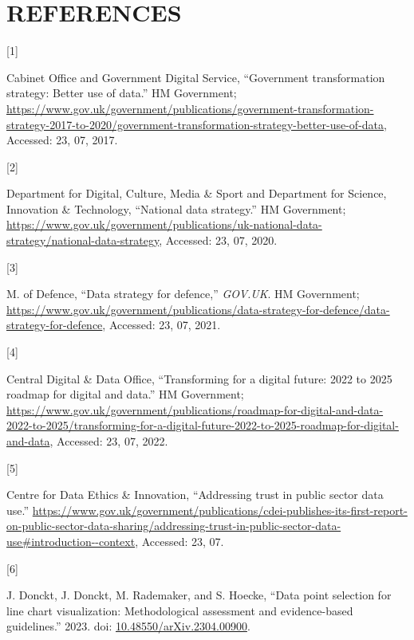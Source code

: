 \documentclass{article}
\newlength{\cslhangindent}
\newlength{\csllabelwidth}
\newlength{\cslentryspacingunit} %
\newenvironment{CSLReferences}[2] %
 {%
  \setlength{\parindent}{0pt}
  \ifodd #1
  \let\oldpar\par
  \def\par{\hangindent=\cslhangindent\oldpar}
  \fi
  \setlength{\parskip}{#2\cslentryspacingunit}
 }%
 {}
\newcommand{\CSLLeftMargin}[1]{\parbox[t]{\csllabelwidth}{#1}}
\newcommand{\CSLRightInline}[1]{\parbox[t]{\linewidth - \csllabelwidth}{#1}\break}
\begin{document}
\newpage

\hypertarget{references}{%
\section*{REFERENCES}\label{references}}

\hypertarget{refs}{}
\begin{CSLReferences}{0}{0}
\leavevmode{}%
\CSLLeftMargin{{[}1{]} }
\CSLRightInline{Cabinet Office and Government Digital Service,
{``Government transformation strategy: Better use of data.''} HM
Government;
\url{https://www.gov.uk/government/publications/government-transformation-strategy-2017-to-2020/government-transformation-strategy-better-use-of-data},
Accessed: 23, 07, 2017.}

\leavevmode{}%
\CSLLeftMargin{{[}2{]} }
\CSLRightInline{Department for Digital, Culture, Media \& Sport and
Department for Science, Innovation \& Technology, {``National data
strategy.''} HM Government;
\url{https://www.gov.uk/government/publications/uk-national-data-strategy/national-data-strategy},
Accessed: 23, 07, 2020.}

\leavevmode{}%
\CSLLeftMargin{{[}3{]} }
\CSLRightInline{M. of Defence, {``Data strategy for defence,''}
\emph{GOV.UK}. HM Government;
\url{https://www.gov.uk/government/publications/data-strategy-for-defence/data-strategy-for-defence},
Accessed: 23, 07, 2021.}

\leavevmode{}%
\CSLLeftMargin{{[}4{]} }
\CSLRightInline{Central Digital \& Data Office, {``Transforming for a
digital future: 2022 to 2025 roadmap for digital and data.''} HM
Government;
\url{https://www.gov.uk/government/publications/roadmap-for-digital-and-data-2022-to-2025/transforming-for-a-digital-future-2022-to-2025-roadmap-for-digital-and-data},
Accessed: 23, 07, 2022.}

\leavevmode{}%
\CSLLeftMargin{{[}5{]} }
\CSLRightInline{Centre for Data Ethics \& Innovation, {``Addressing
trust in public sector data use.''}
\url{https://www.gov.uk/government/publications/cdei-publishes-its-first-report-on-public-sector-data-sharing/addressing-trust-in-public-sector-data-use\#introduction--context},
Accessed: 23, 07.}

\leavevmode{}%
\CSLLeftMargin{{[}6{]} }
\CSLRightInline{J. Donckt, J. Donckt, M. Rademaker, and S. Hoecke,
{``Data point selection for line chart visualization: Methodological
assessment and evidence-based guidelines.''} 2023. doi:
\href{https://doi.org/10.48550/arXiv.2304.00900}{10.48550/arXiv.2304.00900}.}


\end{CSLReferences}
\end{document}
